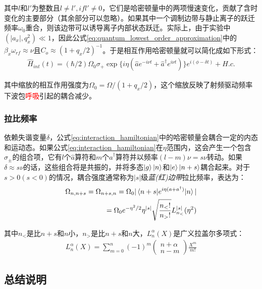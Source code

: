 其中$l$和$l'$为整数且$l\neq l', if l'\neq 0$，它们是哈密顿量中的两项慢速变化，贡献了含时变化的主要部分（其余部分可以忽略）。如果其中一个调制边带与静止离子的跃迁频率$\omega_0$重合，则该边带可以诱导离子内部状态跃迁。实际上，由于实验中$(|a_x|,q_x^2)\ll 1$，因此公式\eqref{eq:quantum_lowest_order_approximation}中的$\beta_x\omega_{rf}\approx\nu$且$C_o\approx(1+q_x/2)^{-1}$。于是相互作用哈密顿量就可以简化成如下形式：
\begin{align}
    \hat{H}_{int}(t)=(\hbar/2)\Omega_0\sigma_+ \exp\{i\eta(\hat{a}e^{-i\nu t}+\hat{a}^\dagger e^{i\nu t})\}e^{i(\phi-\delta t)}+ H.c. \label{eq:interaction_hamiltonian}
\end{align}

其中缩放的相互作用强度为$\Omega_0=\Omega/(1+q_x/2)$，这个缩放反映了射频驱动频率下波包\textcolor{red}{呼吸}引起的耦合减少。

\subsubsection[拉比频率]{拉比频率\label{section:rabi_frequency}}

依赖失谐变量$\delta$，公式\eqref{eq:interaction_hamiltonian}中的哈密顿量会耦合一定的内态和运动态。如果公式\eqref{eq:interaction_hamiltonian}在$\eta$范围内，这会产生一个包含$\sigma_{\pm}$的组合项，它有$l$个$\hat{a}$算符和$m$个$\hat{a}^\dagger$算符并以频率$(l-m)\nu=s\nu$转动。如果$\delta\approx s\nu$的话，这些组合将是共振的，并将多态$\ket{g}\ket{n}$和$\ket{e}\ket{n+s}$耦合起来。对于$s>0(s<0)$的情况，耦合强度通常称为$|s|$级\emph{蓝(红)边带}拉比频率，表达为\cite[]{Leibfried_Meekhof_King_Monroe_Itano_Wineland_2002, Beige_Bose_Braun_Huelga_Knight_Plenio_Vedral_2000}：
\begin{align}
    \Omega_{n,n+s}=\Omega_{n+s,n}=\Omega_0|\braket{n+s|e^{i\eta(a+a^\dagger)}|n}|\\
    =\Omega_0 e^{-\eta^2/2}\eta^{|s|}\sqrt{\frac{n_<!}{n_>!}}L_{n_<}^{|s|}(\eta^2)
\end{align}

其中$n_<$是比$n+s$和$n$小，$n_>$是比$n+s$和$n$大，$L_n^\alpha(X)$是广义拉盖尔多项式：
\begin{align}
    L_n^\alpha(X)=\sum_{m=0}^{n}(-1)^m\begin{pmatrix}
        n+\alpha \\ n-m
    \end{pmatrix}\frac{X^m}{m!}
\end{align}

\subsection[总结说明]{总结说明}

